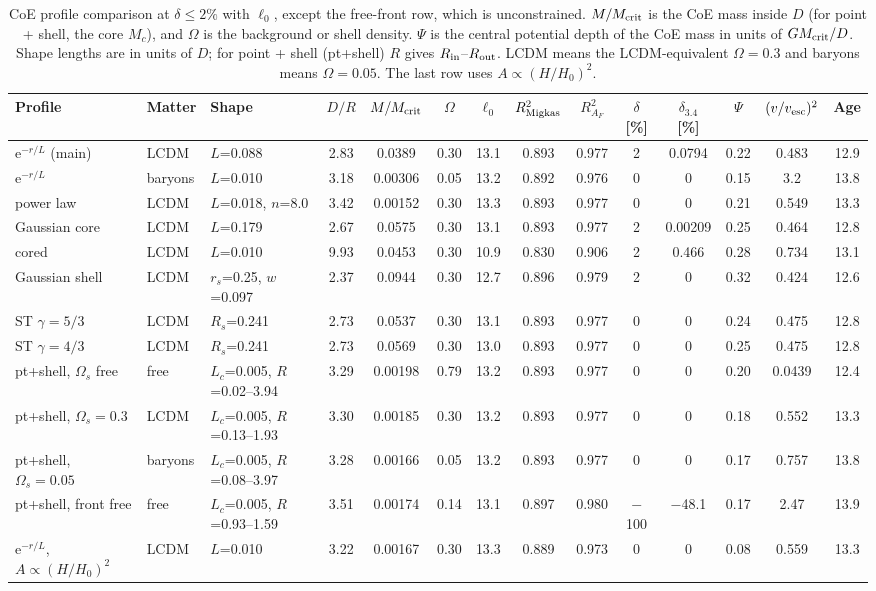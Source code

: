 \documentclass[10pt,letterpaper]{article}
\begin{document}
\begin{table}[H]\centering\scriptsize\setlength{\tabcolsep}{2.0pt}
\caption{CoE profile comparison at $\delta\le2\%$ with $\ell_0$, except the free-front row, which is unconstrained. $M/M_{\rm crit}$ is the CoE mass inside $D$ (for point + shell, the core $M_c$), and $\Omega$ is the background or shell density. $\Psi$ is the central potential depth of the CoE mass in units of $GM_{\rm crit}/D$. Shape lengths are in units of $D$; for point + shell (pt+shell) $R$ gives $R_{\rm in}$--$R_{\rm out}$. LCDM means the LCDM-equivalent $\Omega=0.3$ and baryons means $\Omega=0.05$. The last row uses $A\propto(H/H_0)^2$.}\label{tab:prof}
\begin{tabular}{lllccccccccccc}\toprule
Profile & Matter & Shape & $D/R$ & $M/M_{\rm crit}$ & $\Omega$ & $\ell_0$ & $R^2_{\rm Migkas}$ & $R^2_{A_F}$ & $\delta$ [\%] & $\delta_{3.4}$ [\%] & $\Psi$ & $(v/v_{\rm esc})^2$ & Age\\\midrule
e$^{-r/L}$ (main) & LCDM & $L$=0.088 & 2.83 & 0.0389 & 0.30 & 13.1 & 0.893 & 0.977 & 2 & 0.0794 & 0.22 & 0.483 & 12.9\\
e$^{-r/L}$ & baryons & $L$=0.010 & 3.18 & 0.00306 & 0.05 & 13.2 & 0.892 & 0.976 & 0 & 0 & 0.15 & 3.2 & 13.8\\
power law & LCDM & $L$=0.018, $n$=8.0 & 3.42 & 0.00152 & 0.30 & 13.3 & 0.893 & 0.977 & 0 & 0 & 0.21 & 0.549 & 13.3\\
Gaussian core & LCDM & $L$=0.179 & 2.67 & 0.0575 & 0.30 & 13.1 & 0.893 & 0.977 & 2 & 0.00209 & 0.25 & 0.464 & 12.8\\
cored & LCDM & $L$=0.010 & 9.93 & 0.0453 & 0.30 & 10.9 & 0.830 & 0.906 & 2 & 0.466 & 0.28 & 0.734 & 13.1\\
Gaussian shell & LCDM & $r_s$=0.25, $w$=0.097 & 2.37 & 0.0944 & 0.30 & 12.7 & 0.896 & 0.979 & 2 & 0 & 0.32 & 0.424 & 12.6\\
ST $\gamma=5/3$ & LCDM & $R_s$=0.241 & 2.73 & 0.0537 & 0.30 & 13.1 & 0.893 & 0.977 & 0 & 0 & 0.24 & 0.475 & 12.8\\
ST $\gamma=4/3$ & LCDM & $R_s$=0.241 & 2.73 & 0.0569 & 0.30 & 13.0 & 0.893 & 0.977 & 0 & 0 & 0.25 & 0.475 & 12.8\\
pt+shell, $\Omega_s$ free & free & $L_c$=0.005, $R$=0.02--3.94 & 3.29 & 0.00198 & 0.79 & 13.2 & 0.893 & 0.977 & 0 & 0 & 0.20 & 0.0439 & 12.4\\
pt+shell, $\Omega_s=0.3$ & LCDM & $L_c$=0.005, $R$=0.13--1.93 & 3.30 & 0.00185 & 0.30 & 13.2 & 0.893 & 0.977 & 0 & 0 & 0.18 & 0.552 & 13.3\\
pt+shell, $\Omega_s=0.05$ & baryons & $L_c$=0.005, $R$=0.08--3.97 & 3.28 & 0.00166 & 0.05 & 13.2 & 0.893 & 0.977 & 0 & 0 & 0.17 & 0.757 & 13.8\\
pt+shell, front free & free & $L_c$=0.005, $R$=0.93--1.59 & 3.51 & 0.00174 & 0.14 & 13.1 & 0.897 & 0.980 & $-$100 & $-$48.1 & 0.17 & 2.47 & 13.9\\
e$^{-r/L}$, $A\propto(H/H_0)^2$ & LCDM & $L$=0.010 & 3.22 & 0.00167 & 0.30 & 13.3 & 0.889 & 0.973 & 0 & 0 & 0.08 & 0.559 & 13.3\\
\bottomrule\end{tabular}\end{table}
\end{document}
